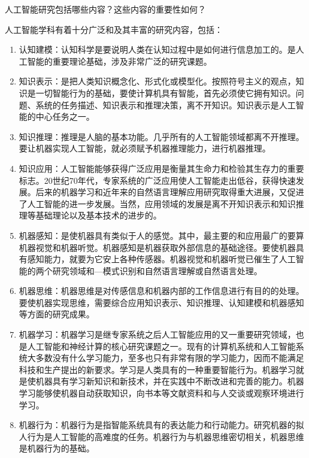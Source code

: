 \begin{question}
人工智能研究包括哪些内容？这些内容的重要性如何？
\end{question}
\begin{solution}
人工智能学科有着十分广泛和及其丰富的研究内容，包括：
\begin{enumerate}
		\item 认知建模：认知科学是要说明人类在认知过程中是如何进行信息加工的。是人工智能的重要理论基础，涉及非常广泛的研究课题。\par
		\item 知识表示：是把人类知识概念化、形式化或模型化。按照符号主义的观点，知识是一切智能行为的基础，要使计算机具有智能，首先必须使它拥有知识。问题、系统的任务描述、知识表示和推理决策，离不开知识。知识表示是人工智能的中心任务之一。\par
		\item 知识推理：推理是人脑的基本功能。几乎所有的人工智能领域都离不开推理。要让机器实现人工智能，就必须赋予机器推理能力，进行机器推理。\par
		\item 知识应用：人工智能能够获得广泛应用是衡量其生命力和检验其生存力的重要标志。20世纪70年代，专家系统的广泛应用使人工智能走出低谷，获得快速发展。后来的机器学习和近年来的自然语言理解应用研究取得重大进展，又促进了人工智能的进一步发展。当然，应用领域的发展是离不开知识表示和知识推理等基础理论以及基本技术的进步的。\par
		\item 机器感知：是使机器具有类似于人的感觉。其中，最主要的和应用最广的要算机器视觉和机器听觉。机器感知是机器获取外部信息的基础途径。要使机器具有感知能力，就要为它安上各种传感器。机器视觉和机器听觉已催生了人工智能的两个研究领域和—模式识别和自然语言理解或自然语言处理。\par
		\item 机器思维：机器思维是对传感信息和机器内部的工作信息进行有目的的处理。要使机器实现思维，需要综合应用知识表示、知识推理、认知建模和机器感知等方面的研究成果。\par
		\item 机器学习：机器学习是继专家系统之后人工智能应用的又一重要研究领域，也是人工智能和神经计算的核心研究课题之一。现有的计算机系统和人工智能系统大多数没有什么学习能力，至多也只有非常有限的学习能力，因而不能满足科技和生产提出的新要求。学习是人类具有的一种重要智能行为。机器学习就是使机器具有学习新知识和新技术，并在实践中不断改进和完善的能力。机器学习能够使机器自动获取知识，向书本等文献资料和与人交谈或观察环境进行学习。\par
		\item 机器行为：机器行为是指智能系统具有的表达能力和行动能力。研究机器的拟人行为是人工智能的高难度的任务。机器行为与机器思维密切相关，机器思维是机器行为的基础。\par

\end{enumerate}
\end{solution}
